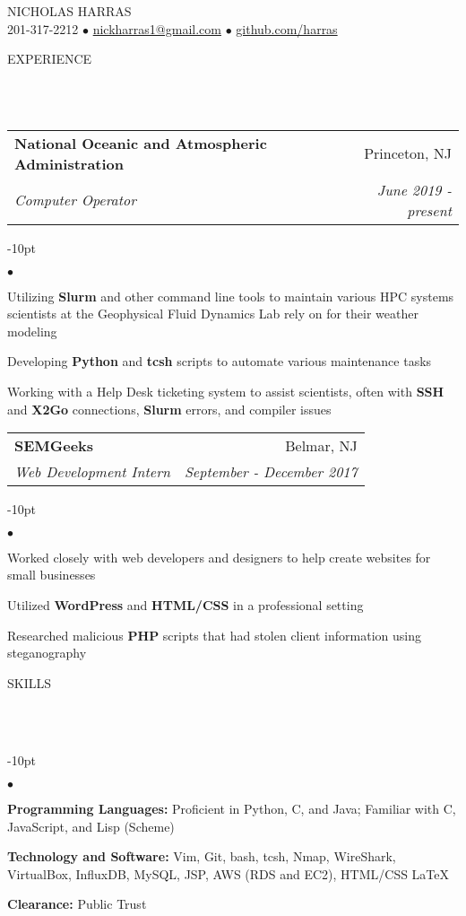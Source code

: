 \documentclass[12pt]{article}
\makeatletter
\newcommand{\mailto}[1]{
	\href{mailto:#1}{#1}
}
\newcommand{\contact}[2]{
	\vspace*{-8pt}
	\begin{center}
		{#1}\\ %
		#2
	\end{center}
	\vspace*{-12pt}
}
\newcommand{\header}[1]{
	\vspace*{12pt} %
	{\hspace*{-14pt}\vspace*{6pt} #1}
	\vspace*{-6pt} 
	\lineunder
}
\newcommand{\lineunder}{
	\vspace*{-8pt} \\ 
	\hspace*{-18pt} 
	\hrulefill \\
}
\newcommand{\subheading}[4]{
 	\vspace{5pt}
    	\begin{tabular*}{1.01\textwidth}
    		{l@{\extracolsep{\fill}}r}
      		\hspace{-16pt}\textbf{#1} & #2 \\
      		\hspace{-16pt}\textit{\small#3} & \textit{\small #4} \\
    	\end{tabular*}
    \vspace{-4pt}
}
\newenvironment{achievements}{
\begin{adjustwidth}{-10pt}{}
  \begin{list}{$\bullet$}{
  	\topsep 0pt \itemsep -4pt}}
  	{\vspace*{2pt}\end{list}
\end{adjustwidth}
}
\def\cpp{
	{\hspace{-0.25em}C\nolinebreak[4]\hspace{-.05em}\raisebox{.4ex}{\tiny		\bf ++}}}
\makeatother
\begin{document}
\small
\smallskip
\vspace*{-40pt}

\contact{\huge{N}\LARGE{ICHOLAS} \huge{H}\LARGE{ARRAS}}{201-317-2212 $\bullet$ \mailto{nickharras1@gmail.com} $\bullet$ \href{https://www.github.com/harras}{github.com/harras}}


\header{EXPERIENCE}

\subheading
	{National Oceanic and Atmospheric Administration}{Princeton, NJ}
	{Computer Operator}{June 2019 - present}
	\begin{achievements}
		\item Utilizing \textbf{Slurm} and other command line tools to maintain various HPC systems scientists at the Geophysical Fluid Dynamics Lab rely on for their weather modeling
		\item Developing \textbf{Python} and \textbf{tcsh} scripts to automate various maintenance tasks
		\item Working with a Help Desk ticketing system to assist scientists, often with \textbf{SSH} and \textbf{X2Go} connections, \textbf{Slurm} errors, and compiler issues
		
	\end{achievements}
	
\subheading
	{SEMGeeks}{Belmar, NJ}
	{Web Development Intern}{September - December 2017}
	\begin{achievements}
		\item Worked closely with web developers and designers to help create websites for small businesses
		\item Utilized \textbf{WordPress} and \textbf{HTML/CSS} in a professional setting
		\item Researched malicious \textbf{PHP} scripts that had stolen client information using steganography
	\end{achievements}

	
\header{SKILLS}
	\begin{achievements}
		\item{\bf Programming Languages:} Proficient in Python, C, and Java; Familiar with \cpp, JavaScript, and Lisp (Scheme)
		\item{\bf Technology and Software:} Vim, Git, bash, tcsh, Nmap, WireShark, VirtualBox, InfluxDB, MySQL, JSP, AWS (RDS and EC2), HTML/CSS \LaTeX
		\item{\bf Clearance:} Public Trust
	\end{achievements}
\end{document}
